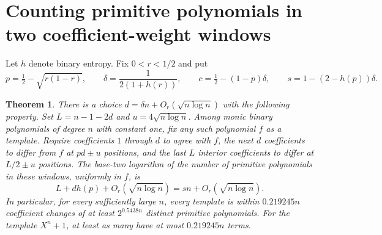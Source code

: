 \documentclass[11pt]{article}
\newtheorem{theorem}{Theorem}
\begin{document}
\section{Counting primitive polynomials in two coefficient-weight windows}
\label{sec:weight-entropy-rate}
Let \(h\) denote binary entropy. Fix \(0<r<1/2\) and put
\[
 p=\tfrac12-\sqrt{r(1-r)},\qquad
 \delta=\frac1{2(1+h(r))},\qquad
 c=\tfrac12-(1-p)\delta,\qquad s=1-(2-h(p))\delta .
\]
\begin{theorem}\label{thm:weight-entropy-rate}
There is a choice \(d=\delta n+O_r(\sqrt{n\log n})\) with the
following property. Set \(L=n-1-2d\) and \(u=4\sqrt{n\log n}\).
Among monic binary polynomials of degree \(n\) with constant one,
fix any such polynomial \(f\) as a template. Require coefficients
\(1\) through \(d\) to agree with \(f\), the next \(d\) coefficients
to differ from \(f\) at \(pd\pm u\) positions, and the last \(L\)
interior coefficients to differ at \(L/2\pm u\) positions.
The base-two logarithm of the number of primitive polynomials in
these windows, uniformly in \(f\), is
\[
 L+d h(p)+O_r(\sqrt{n\log n})=sn+O_r(\sqrt{n\log n}).
\]
In particular, for every sufficiently large \(n\), every template
is within \(0.219245n\) coefficient changes of at least
\(2^{0.5438n}\) distinct primitive polynomials. For the template
\(X^n+1\), at least as many have at most \(0.219245n\) terms.
\end{theorem}
\end{document}
